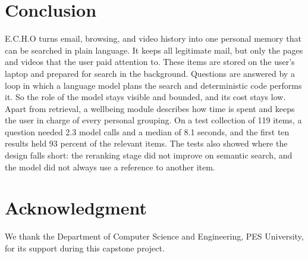 \documentclass[conference]{IEEEtran}
\begin{document}
\section{Conclusion}\label{sec:conc}
E.C.H.O turns email, browsing, and video history into one personal memory that can be searched in plain language. It keeps all legitimate mail, but only the pages and videos that the user paid attention to. These items are stored on the user's laptop and prepared for search in the background. Questions are answered by a loop in which a language model plans the search and deterministic code performs it. So the role of the model stays visible and bounded, and its cost stays low. Apart from retrieval, a wellbeing module describes how time is spent and keeps the user in charge of every personal grouping. On a test collection of 119 items, a question needed 2.3 model calls and a median of 8.1 seconds, and the first ten results held 93 percent of the relevant items. The tests also showed where the design falls short: the reranking stage did not improve on semantic search, and the model did not always use a reference to another item.

\section*{Acknowledgment}
We thank the Department of Computer Science and Engineering, PES University, for its support during this capstone project.
\end{document}
